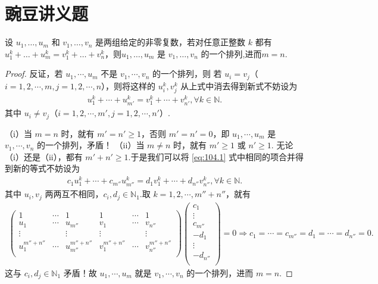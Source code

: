 \documentclass[../../main.tex]{subfiles}
\begin{document}
\section{豌豆讲义题}

\begin{lemma}\label{lemma:引理1564561}
设 $u_1,\dots,u_m$ 和 $v_1,\dots,v_n$ 是两组给定的非零复数，若对任意正整数 $k$ 都有 $u_1^k+\dots+u_m^k=v_1^k+\dots+v_n^k$，则$u_1,\dots,u_m$ 是 $v_1,\dots,v_n$ 的一个排列,进而$m=n$.
\end{lemma}
\begin{proof}
反证，若 $u_1,\cdots ,u_m$ 不是 $v_1,\cdots ,v_n$ 的一个排列，则
若 $u_i=v_j$（$i=1,2,\cdots ,m,j=1,2,\cdots ,n$），则将这样的 $u_{i}^{k},v_{j}^{k}$ 从上式中消去得到新式不妨设为
\begin{align}
u_{1}^{k}+\cdots +u_{m'}^{k}=v_{1}^{k}+\cdots +v_{n'}^{k},\forall k\in \mathbb{N} .\label{eq:104.1}
\end{align}
其中 $u_i\ne v_j$（$i=1,2,\cdots ,m',j=1,2,\cdots ,n'$）.

（i）当 $m=n$ 时，就有 $m' =n' \geqslant 1$，否则 $m' =n' =0$，即 $u_1,\cdots ,u_m$ 是 $v_1,\cdots ,v_n$ 的一个排列，矛盾！
（ii）当 $m\ne n$ 时，就有 $m' \geqslant 1$ 或 $n' \geqslant 1$.
无论（i）还是（ii），都有 $m' +n' \geqslant 1$.于是我们可以将 \eqref{eq:104.1} 式中相同的项合并得到新的等式不妨设为
\begin{align*}
c_1u_{1}^{k}+\cdots +c_{m''}u_{m''}^{k}=d_1v_{1}^{k}+\cdots +d_{n''}v_{n''}^{k},\forall k\in \mathbb{N} .
\end{align*}
其中 $u_i,v_j$ 两两互不相同，$c_i,d_j\in \mathbb{N} _1$.取 $k=1,2,\cdots ,m'' +n''$，就有
\begin{align*}
\begin{pmatrix}
1&		\cdots&		1&		1&		\cdots&		1\\
u_1&		\cdots&		u_{m''}&		v_1&		\cdots&		v_{n''}\\
\vdots&		&		\vdots&		\vdots&		&		\vdots\\
u_{1}^{m'' +n''}&		\cdots&		u_{m''}^{m'' +n''}&		v_{1}^{m'' +n''}&		\cdots&		v_{n''}^{m'' +n''}\\
\end{pmatrix} \begin{pmatrix}
c_1\\
\vdots\\
c_{m''}\\
-d_1\\
\vdots\\
-d_{n''}\\
\end{pmatrix} =0\Rightarrow c_1=\cdots =c_{m''}=d_1=\cdots =d_{n''}=0.
\end{align*}
这与 $c_i,d_j\in \mathbb{N} _1$ 矛盾！故 $u_1,\cdots ,u_m$ 就是 $v_1,\cdots ,v_n$ 的一个排列，进而 $m=n$.
\end{proof}
\end{document}
